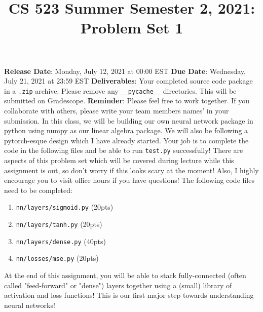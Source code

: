 \documentclass{article}
\title{CS 523 Summer Semester 2, 2021: Problem Set 1}
\begin{document}
\maketitle
\textbf{Release Date}: Monday, July 12, 2021 at 00:00 EST\newline
\textbf{Due Date}: Wednesday, July 21, 2021 at 23:59 EST\newline
\textbf{Deliverables}: Your completed source code package in a \texttt{.zip} archive. Please remove any \texttt{\_\_pycache\_\_} directories. This will be submitted on Gradescope.\newline
\textbf{Reminder}: Please feel free to work together. If you collaborate with others, please write your team members names' in your submission.
\newline
\newline
In this class, we will be building our own neural network package in python using numpy as our linear algebra package. We will also be following a pytorch-esque design which I have already started. Your job is to complete the code in the following files and be able to run \texttt{test.py} successfully!
\newline
\newline
There are aspects of this problem set which will be covered during lecture while this assignment is out, so don't worry if this looks scary at the moment! Also, I highly encourage you to visit office hours if you have questions!
\newline
\newline
The following code files need to be completed:
\begin{enumerate}
    \item \texttt{nn/layers/sigmoid.py} (20pts)
    \item \texttt{nn/layers/tanh.py} (20pts)
    \item \texttt{nn/layers/dense.py} (40pts)
    \item \texttt{nn/losses/mse.py} (20pts)
\end{enumerate}

At the end of this assignment, you will be able to stack fully-connected (often called "feed-forward" or "dense") layers together using a (small) library of activation and loss functions! This is our first major step towards understanding neural networks!
\end{document}
